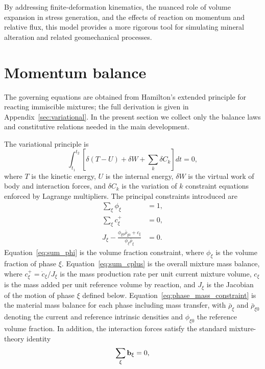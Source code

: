 \documentclass[11pt]{article}
\begin{document}
By addressing finite-deformation kinematics, the nuanced role of volume expansion in stress generation, and the effects of reaction on momentum and relative flux, this model provides a more rigorous tool for simulating mineral alteration and related geomechanical processes.


\section{Momentum balance}

The governing equations are obtained from Hamilton's extended principle for reacting immiscible mixtures; the full derivation is given in Appendix~\ref{sec:variational}.  In the present section we collect only the balance laws and constitutive relations needed in the main development.

The variational principle is
\[
  \int_{t_1}^{t_2}\left[\delta(T-U)+\delta W+\sum_k \delta C_k\right]dt = 0,
\]
where $T$ is the kinetic energy, $U$ is the internal energy, $\delta W$ is the virtual work of body and interaction forces, and $\delta C_k$ is the variation of $k$ constraint equations enforced by Lagrange multipliers.  The principal constraints introduced are
\begin{subequations}
\begin{align}
  \sum_\xi \phi_\xi &=1, \label{eq:sum_phi}\\
  \sum_\xi c^{+}_\xi &= 0, \label{eq:sum_cplus}\\
  J_\xi - \frac{\phi_{\xi 0}\bar\rho_{\xi 0}+c_\xi}{\phi_\xi\bar\rho_\xi} &= 0. \label{eq:phase_mass_constraint}
\end{align}
\end{subequations}
Equation~\eqref{eq:sum_phi} is the volume fraction constraint, where $\phi_\xi$ is the volume fraction of phase $\xi$.  Equation~\eqref{eq:sum_cplus} is the overall mixture mass balance, where $c_\xi^+=\dot c_\xi/J_\xi$ is the mass production rate per unit current mixture volume, $c_\xi$ is the mass added per unit reference volume by reaction, and $J_\xi$ is the Jacobian of the motion of phase $\xi$ defined below.  Equation~\eqref{eq:phase_mass_constraint} is the material mass balance for each phase including mass transfer, with $\bar\rho_\xi$ and $\bar\rho_{\xi 0}$ denoting the current and reference intrinsic densities and $\phi_{\xi 0}$ the reference volume fraction.  In addition, the interaction forces satisfy the standard mixture-theory identity
\begin{equation}
  \sum_\xi \mathbf{b}_\xi = 0,
  \label{eq:sum_b}
\end{equation}
\end{document}
